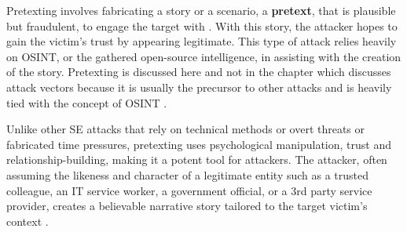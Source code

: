 Pretexting involves fabricating a story or a scenario, a \textbf{pretext}, that is plausible but fraudulent, to engage the target  with \citep{contehCybersecurityRisksVulnerabilities2016}. With this story, the attacker hopes to gain the victim's trust by appearing legitimate. This type of attack relies heavily on OSINT, or the gathered open-source intelligence, in assisting with the creation of the story. Pretexting is discussed here and not in the chapter which discusses attack vectors because it is usually the precursor to other attacks and is heavily tied with the concept of OSINT \citep{hadnagySocialEngineering2018}.

Unlike other SE attacks that rely on technical methods or overt threats or fabricated time pressures, pretexting uses psychological manipulation, trust and relationship-building, making it a potent tool for attackers. The attacker, often assuming the likeness and character of a legitimate entity such as a trusted colleague, an IT service worker, a government official, or a 3rd party service provider, creates a believable narrative story tailored to the target victim's context \citep{mitnickArtDeceptionControlling2003}.



